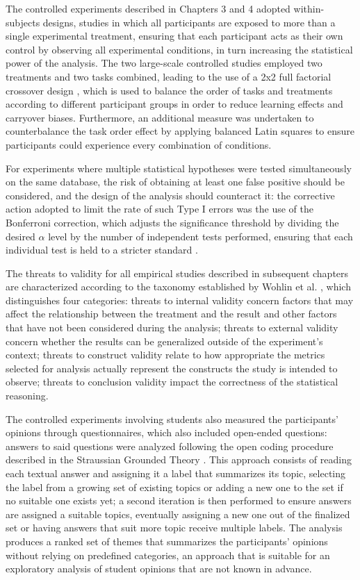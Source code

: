{{The controlled experiments described in Chapters 3 and 4 adopted within-subjects designs, studies in which all participants are exposed to more than a single experimental treatment, ensuring that each participant acts as their own control by observing all experimental conditions, in turn increasing the statistical power of the analysis. The two large-scale controlled studies employed two treatments and two tasks combined, leading to the use of a 2x2 full factorial crossover design \cite{vegas2016crossover}, which is used to balance the order of tasks and treatments according to different participant groups in order to reduce learning effects and carryover biases. Furthermore, an additional measure was undertaken to counterbalance the task order effect by applying balanced Latin squares to ensure participants could experience every combination of conditions. 

For experiments where multiple statistical hypotheses were tested simultaneously on the same database, the risk of obtaining at least one false positive should be considered, and the design of the analysis should counteract it: the corrective action adopted to limit the rate of such Type I errors was the use of the Bonferroni correction, which adjusts the significance threshold by dividing the desired $\alpha$ level by the number of independent tests performed, ensuring that each individual test is held to a stricter standard \cite{abdi2007bonferroni}.

The threats to validity for all empirical studies described in subsequent chapters are characterized according to the taxonomy established by Wohlin et al. \cite{wohlin2012experimentation}, which distinguishes four categories: threats to internal validity concern factors that may affect the relationship between the treatment and the result and other factors that have not been considered during the analysis; threats to external validity concern whether the results can be generalized outside of the experiment's context; threats to construct validity relate to how appropriate the metrics selected for analysis actually represent the constructs the study is intended to observe; threats to conclusion validity impact the correctness of the statistical reasoning.

The controlled experiments involving students also measured the participants' opinions through questionnaires, which also included open-ended questions: answers to said questions were analyzed following the open coding procedure described in the Straussian Grounded Theory \cite{strauss1998basics}. This approach consists of reading each textual answer and assigning it a label that summarizes its topic, selecting the label from a growing set of existing topics or adding a new one to the set if no suitable one exists yet; a second iteration is then performed to ensure answers are assigned a suitable topics, eventually assigning a new one out of the finalized set or having answers that suit more topic receive multiple labels. The analysis produces a ranked set of themes that summarizes the participants' opinions without relying on predefined categories, an approach that is suitable for an exploratory analysis of student opinions that are not known in advance.

}}
